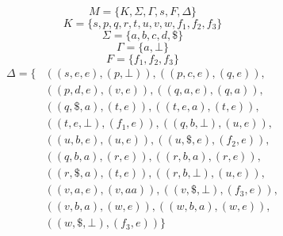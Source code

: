 \documentclass[12pt]{article}
\begin{document}
$$M = \{K, \Sigma, \Gamma, s, F, \Delta\}$$
$$K = \{s,p,q,r,t,u,v,w,f_1,f_2,f_3\}$$
$$\Sigma = \{a,b,c,d,\$\}$$
$$\Gamma = \{a, \bot\}$$
$$F = \{f_1, f_2, f_3\}$$
\begin{equation*}
    \begin{split}
        \Delta = \{&((s,e,e),(p,\bot)), ((p,c,e),(q,e)),\\
                   &((p,d,e),(v,e)), ((q,a,e),(q,a)),\\
                   &((q,\$,a),(t,e)), ((t,e,a),(t,e)),\\
                   &((t,e,\bot),(f_1,e)), ((q,b,\bot),(u,e)),\\
                   &((u,b,e),(u,e)), ((u,\$,e),(f_2,e)),\\
                   &((q,b,a),(r,e)), ((r,b,a),(r,e)),\\
                   &((r,\$,a),(t,e)), ((r,b,\bot),(u,e)),\\
                   &((v,a,e),(v,aa)), ((v,\$,\bot),(f_3,e)),\\
                   &((v,b,a),(w,e)), ((w,b,a),(w,e)),\\
                   &((w,\$,\bot),(f_3,e)) 
                    \}
    \end{split}
\end{equation*}
\end{document}
